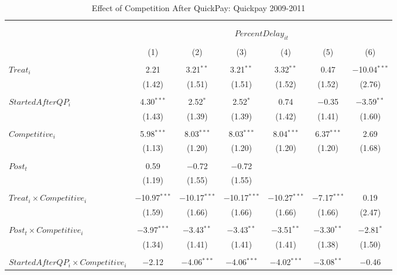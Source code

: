 \documentclass[
]{article}
\begin{document}
\begin{table}[H] \centering 
  \caption{Effect of Competition After QuickPay: Quickpay 2009-2011} 
  \label{} 
\small 
\begin{tabular}{@{\extracolsep{-3pt}}lcccccc} 
\\[-1.8ex]\hline 
\hline \\[-1.8ex] 
\\[-1.8ex] & \multicolumn{6}{c}{$PercentDelay_{it}$  } \\ 
\\[-1.8ex] & (1) & (2) & (3) & (4) & (5) & (6)\\ 
\hline \\[-1.8ex] 
 $Treat_i$ & 2.21 & 3.21$^{**}$ & 3.21$^{**}$ & 3.32$^{**}$ & 0.47 & $-$10.04$^{***}$ \\ 
  & (1.42) & (1.51) & (1.51) & (1.52) & (1.52) & (2.76) \\ 
  & & & & & & \\ 
 $StartedAfterQP_i$ & 4.30$^{***}$ & 2.52$^{*}$ & 2.52$^{*}$ & 0.74 & $-$0.35 & $-$3.59$^{**}$ \\ 
  & (1.43) & (1.39) & (1.39) & (1.42) & (1.41) & (1.60) \\ 
  & & & & & & \\ 
 $Competitive_i$ & 5.98$^{***}$ & 8.03$^{***}$ & 8.03$^{***}$ & 8.04$^{***}$ & 6.37$^{***}$ & 2.69 \\ 
  & (1.13) & (1.20) & (1.20) & (1.20) & (1.20) & (1.68) \\ 
  & & & & & & \\ 
 $Post_t$ & 0.59 & $-$0.72 & $-$0.72 &  &  &  \\ 
  & (1.19) & (1.55) & (1.55) &  &  &  \\ 
  & & & & & & \\ 
 $Treat_i \times Competitive_i$ & $-$10.97$^{***}$ & $-$10.17$^{***}$ & $-$10.17$^{***}$ & $-$10.27$^{***}$ & $-$7.17$^{***}$ & 0.19 \\ 
  & (1.59) & (1.66) & (1.66) & (1.66) & (1.66) & (2.47) \\ 
  & & & & & & \\ 
 $Post_t \times Competitive_i$ & $-$3.97$^{***}$ & $-$3.43$^{**}$ & $-$3.43$^{**}$ & $-$3.51$^{**}$ & $-$3.30$^{**}$ & $-$2.81$^{*}$ \\ 
  & (1.34) & (1.41) & (1.41) & (1.41) & (1.38) & (1.50) \\ 
  & & & & & & \\ 
 $StartedAfterQP_i \times Competitive_i$ & $-$2.12 & $-$4.06$^{***}$ & $-$4.06$^{***}$ & $-$4.02$^{***}$ & $-$3.08$^{**}$ & $-$0.46 \\ 

\end{tabular}
\end{table}
\end{document}
